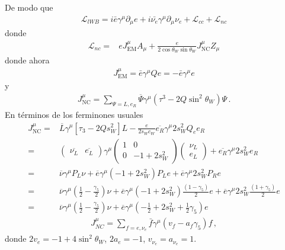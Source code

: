 De modo que
\begin{align}
\mathcal{L}_{l W B}=i\bar{e}\gamma^\mu\partial_\mu e+i\bar{\nu_e}\gamma^\mu\partial_\mu\nu_e+\mathcal{L}_{cc}+\mathcal{L}_{nc}
\end{align}
donde
\begin{align}
\label{eq:228}
\mathcal{L}_{nc}=&eJ^\mu_{\text{EM}}A_\mu+\frac{e}{2\cos\theta_W\sin\theta_W}J^\mu_{\text{NC}}Z_\mu
\end{align}
donde ahora
\begin{align}
  J^\mu_{\text{EM}}=\bar{e}\gamma^\mu Q e=-\bar{e}\gamma^\mu e
\end{align}
y 
\begin{align}
  J^\mu_{\text{NC}}=\sum_{\Psi=L,e_R}\overline{\Psi}\gamma^\mu\left(\tau^3-2Q\sin^2\theta_W\right)\Psi\,.
\end{align}
En t\'erminos de los ferminones usuales
\begin{align}
   J^\mu_{\text{NC}}=&\overline{L}\gamma^\mu\left[\tau_3-2Q s^2_W\right]L 
-\frac{e}{2s_W c_W}\overline{e_R}\gamma^\mu2s_W^2Q_e e_R \nonumber\\
  =&\begin{pmatrix}
  \overline{\nu_L} & \overline{e_L}  
  \end{pmatrix}
\gamma^\mu
\begin{pmatrix}
  1 & 0\\
  0           & -1+2s_W^2
\end{pmatrix}
\begin{pmatrix}
  \nu_L\\
  e_L
\end{pmatrix}
 +\overline{e_R}\gamma^\mu2s_W^2 e_R \nonumber\\
   =&\overline{\nu}\gamma^\mu P_L\nu
+\overline{e}\gamma^\mu\left(-1+2s^2_W\right)P_L e
+\overline{e}\gamma^\mu2s_W^2P_R e\nonumber\\
   =&\overline{\nu}\gamma^\mu\left(\frac{1}{2}-\frac{\gamma_5}{2}\right)\nu
+\overline{e}\gamma^\mu\left(-1+2s^2_W\right)\frac{(1-\gamma_5)}{2} e
+\overline{e}\gamma^\mu2s_W^2\frac{(1+\gamma_5)}{2}e\nonumber\\
   =&\overline{\nu}\gamma^\mu\left(\frac{1}{2}-\frac{\gamma_5}{2}\right)\nu
+\overline{e}\gamma^\mu\left(-\frac{1}{2}+2s^2_W+\frac{1}{2}\gamma_5\right) e
\end{align}
\begin{align}
  J^\mu_{NC}=\sum_{f=e,\nu_e}\bar{f}\gamma^\mu(v_f-a_f\gamma_5)f\,,
\end{align}
donde $2v_e=-1+4\sin^2\theta_W$, $2a_e=-1$, $v_{\nu_e}=a_{\nu_e}=1$. 

